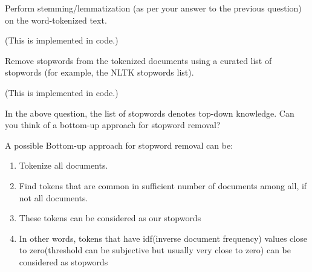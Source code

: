 \documentclass[11pt]{exam}
\begin{document}
\begin{questions}
\question Perform stemming/lemmatization (as per your answer to the previous question) on the
word-tokenized text.
\begin{solution}
    (This is implemented in code.)
\end{solution}

\question Remove stopwords from the tokenized documents using a curated list of stopwords (for
example, the NLTK stopwords list).
\begin{solution}
    (This is implemented in code.)
\end{solution}

\question In the above question, the list of stopwords denotes top-down knowledge. Can you think
of a bottom-up approach for stopword removal?
\begin{solution}
    A possible Bottom-up approach for stopword removal can be:
    \begin{enumerate} 
    \item  Tokenize all documents.
    \item  Find tokens that are common in sufficient number of documents among all, if not all documents.
    \item  These tokens can be considered as our stopwords
    \item In other words, tokens that have idf(inverse document frequency) values close to zero(threshold can be subjective but usually very close to zero) can be considered as stopwords
    \end{enumerate}
\end{solution}

\end{questions}
\end{document}
